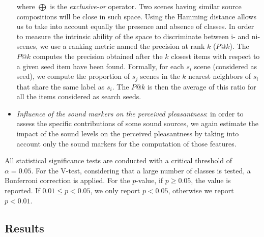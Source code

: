 \documentclass[12pt]{elsarticle}
\begin{document}
\begin{itemize}
where $\bigoplus$ is the \emph{exclusive-or} operator. Two scenes having similar source compositions will be close in such space. Using the Hamming distance allows us to take into account equally the presence and absence of classes. In order to measure the intrinsic ability of the space to discriminate between i- and ni-scenes, we use a ranking metric named the precision at rank $k$ ($P@k$). The $P@k$ computes the precision obtained after the $k$ closest items with respect to a given seed item have been found. Formally, for each $s_i$ scene (considered as seed), we compute the proportion of $s_j$ scenes in the $k$ nearest neighbors of $s_i$ that share the same label as $s_i$. The $P@k$ is then the average of this ratio for all the items considered as search seeds.


\item \emph{Influence of the sound markers on the perceived pleasantness}: in order to assess the specific contributions of some sound sources, we again estimate the impact of the sound levels on the perceived pleasantness by taking into account only the sound markers for the computation of those features.
\end{itemize}


All statistical significance tests are conducted with a critical threshold of $\alpha=0.05$. For the V-test, considering that a large number of classes is tested, a Bonferroni correction is applied. For the $p$-value, if $p\geq0.05$, the value is reported. If $0.01\leq p<0.05$, we only report $p<0.05$, otherwise we report $p<0.01$.

\subsection{Results}
\end{document}
